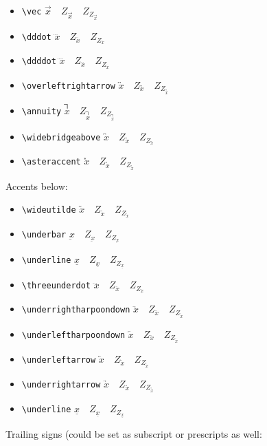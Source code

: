 \begin{itemize}
\item \verb+\vec+ $\vec x\quad Z_{\vec x}\quad Z_{Z_{\vec x}}$
\item \verb+\dddot+ $\dddot x\quad Z_{\dddot x}\quad Z_{Z_{\dddot x}}$
\item \verb+\ddddot+ $\ddddot x\quad Z_{\ddddot x}\quad Z_{Z_{\ddddot x}}$
\item \verb+\overleftrightarrow+ $\overleftrightarrow x\quad Z_{\overleftrightarrow x}\quad Z_{Z_{\overleftrightarrow x}}$
\item \verb+\annuity+ $\annuity x\quad Z_{\annuity x}\quad Z_{Z_{\annuity x}}$
\item \verb+\widebridgeabove+ $\widebridgeabove x\quad Z_{\widebridgeabove x}\quad Z_{Z_{\widebridgeabove x}}$
\item \verb+\asteraccent+ $\asteraccent x\quad Z_{\asteraccent x}\quad Z_{Z_{\asteraccent x}}$
\end{itemize}
Accents below:
\begin{itemize}
\item \verb+\wideutilde+ $\wideutilde x\quad Z_{\wideutilde x}\quad Z_{Z_{\wideutilde x}}$
\item \verb+\underbar+ $\underbar x\quad Z_{\underbar x}\quad Z_{Z_{\underbar x}}$
\item \verb+\underline+ $\underline x\quad Z_{\underline x}\quad Z_{Z_{\underline x}}$
\item \verb+\threeunderdot+ $\threeunderdot x\quad Z_{\threeunderdot x}\quad Z_{Z_{\threeunderdot x}}$
\item \verb+\underrightharpoondown+ $\underrightharpoondown x\quad Z_{\underrightharpoondown x}\quad Z_{Z_{\underrightharpoondown x}}$
\item \verb+\underleftharpoondown+ $\underleftharpoondown x\quad Z_{\underleftharpoondown x}\quad Z_{Z_{\underleftharpoondown x}}$
\item \verb+\underleftarrow+ $\underleftarrow x\quad Z_{\underleftarrow x}\quad Z_{Z_{\underleftarrow x}}$
\item \verb+\underrightarrow+ $\underrightarrow x\quad Z_{\underrightarrow x}\quad Z_{Z_{\underrightarrow x}}$
\item \verb+\underline+ $\underline x\quad Z_{\underline x}\quad Z_{Z_{\underline x}}$
\end{itemize}
Trailing signs (could be set as subscript or prescripts as well:
